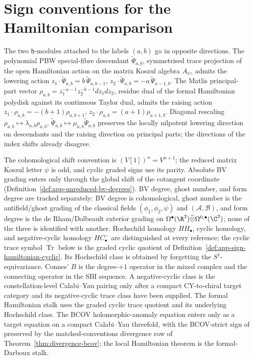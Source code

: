 \section{Sign conventions for the Hamiltonian comparison}
\label{sec:app-sign-conventions}
\label{app:sign-conventions}

The two \(\mathfrak h\)-modules attached to the labels \((a,b)\) go in
opposite directions.  The polynomial PBW special-fibre descendant
\(\widetilde\Psi_{a,b}\), symmetrised trace projection of the open
Hamiltonian action on the matrix Koszul algebra \(A_\psi\), admits the
lowering action
\(z_1\cdot\widetilde\Psi_{a,b}=b\,\widetilde\Psi_{a,b-1}\),
\(z_2\cdot\widetilde\Psi_{a,b}=-a\,\widetilde\Psi_{a-1,b}\).  The
Matlis principal-part vector
\(\rho_{a,b}=z_1^{-a-1}z_2^{-b-1}dz_1dz_2\), residue dual of the
formal Hamiltonian polydisk against its continuous Taylor dual, admits
the raising action \(z_1\cdot\rho_{a,b}=-(b+1)\rho_{a,b+1}\),
\(z_2\cdot\rho_{a,b}=(a+1)\rho_{a+1,b}\).  Diagonal rescaling
\(\rho_{a,b}\mapsto\lambda_{a,b}\rho_{a,b}\),
\(\widetilde\Psi_{a,b}\mapsto\mu_{a,b}\widetilde\Psi_{a,b}\) preserves
the locally nilpotent lowering direction on descendants and the raising
direction on principal parts; the directions of the index shifts already
disagree.

The cohomological shift convention is \((V[1])^n=V^{n+1}\); the
reduced matrix Koszul letter \(\psi\) is odd, and cyclic graded signs
use its parity.  Absolute BV grading enters only through the global
shift of the cotangent coordinate
(Definition~\ref{def:app-unreduced-bv-degrees}).  BV degree, ghost
number, and form degree are tracked separately: BV degree is
cohomological, ghost number is the antifield/ghost grading of the
classical fields \((\phi_1,\phi_2,\psi)\) and
\((\mathcal A,\mathcal B)\), and form degree is the de Rham/Dolbeault
exterior grading on \(\Omega^\bullet(\R^2)\widehat\otimes
\Omega^{0,\bullet}(\C^2)\); none of the three is identified with
another.  Hochschild homology \(HH_\bullet\), cyclic homology, and
negative-cyclic homology \(HC^-_\bullet\) are distinguished at every
reference; the cyclic trace symbol \(\operatorname{Tr}\) below is the
graded cyclic quotient of
Definition~\ref{def:app-sign-hamiltonian-cyclic}.  Its Hochschild
class is obtained by forgetting the \(S^1\)-equivariance.  Connes'
\(B\) is the degree-\(+1\) operator in the mixed complex and the
connecting operator in the SBI sequence.  A negative-cyclic class is
the constellation-level Calabi--Yau pairing only after a compact
CY-to-chiral target category and its negative-cyclic trace class have
been supplied.  The formal Hamiltonian stalk uses the graded cyclic
trace quotient and its underlying Hochschild class.  The BCOV holomorphic-anomaly
equation enters only as a
target equation on a compact Calabi--Yau threefold, with the
BCOV-strict sign of \cite{bcov} preserved by the matched-conventions
divergence row of Theorem~\ref{thm:divergence-bcov}; the local
Hamiltonian theorem is the formal-Darboux stalk.


